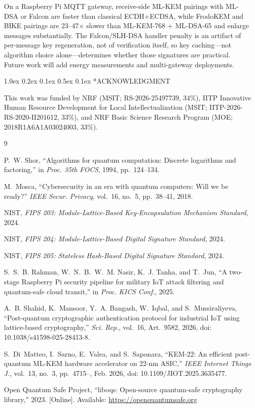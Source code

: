 \documentclass[a4paper,twocolumn,10pt]{article}
\makeatletter
\renewcommand{\section}{\@startsection{section}{1}{\z@}%
  {1.0ex \@plus 0.2ex \@minus 0.1ex}%
  {0.5ex \@plus 0.1ex}%
  {\normalfont\normalsize\bfseries}}
\makeatother
\begin{document}
On a Raspberry Pi MQTT gateway, receive-side ML-KEM pairings with ML-DSA or Falcon are faster than classical ECDH+ECDSA, while FrodoKEM and BIKE pairings are 23--47$\times$ slower than ML-KEM-768 + ML-DSA-65 and enlarge messages substantially. The Falcon/SLH-DSA handler penalty is an artifact of per-message key regeneration, not of verification itself, so key caching---not algorithm choice alone---determines whether those signatures are practical. Future work will add energy measurements and multi-gateway deployments.

\section*{ACKNOWLEDGMENT}

This work was funded by NRF (MSIT; RS-2026-25497739, 34\%), IITP Innovative Human Resource Development for Local Intellectualization (MSIT; IITP-2026-RS-2020-II201612, 33\%), and NRF Basic Science Research Program (MOE; 2018R1A6A1A03024003, 33\%).

\balance
\begin{thebibliography}{9}
\fontsize{8}{9.5}\selectfont

P.~W. Shor, ``Algorithms for quantum computation: Discrete logarithms and factoring,'' in \textit{Proc. 35th FOCS}, 1994, pp.~124--134.

M.~Mosca, ``Cybersecurity in an era with quantum computers: Will we be ready?'' \textit{IEEE Secur. Privacy}, vol.~16, no.~5, pp.~38--41, 2018.

NIST, \textit{FIPS 203: Module-Lattice-Based Key-Encapsulation Mechanism Standard}, 2024.

NIST, \textit{FIPS 204: Module-Lattice-Based Digital Signature Standard}, 2024.

NIST, \textit{FIPS 205: Stateless Hash-Based Digital Signature Standard}, 2024.

S.~S.~B. Rahman, W.~N.~B.~W.~M. Nasir, K.~J. Tanha, and T.~Jun, ``A two-stage Raspberry Pi security pipeline for military IoT attack filtering and quantum-safe cloud transit,'' in \textit{Proc. KICS Conf.}, 2025.

A.~B. Shahid, K.~Mansoor, Y.~A. Bangash, W.~Iqbal, and S.~Mussiraliyeva, ``Post-quantum cryptographic authentication protocol for industrial IoT using lattice-based cryptography,'' \textit{Sci. Rep.}, vol.~16, Art.~9582, 2026, doi: 10.1038/s41598-025-28413-8.

S.~Di~Matteo, I.~Sarno, E.~Valea, and S.~Saponara, ``KEM-22: An efficient post-quantum ML-KEM hardware accelerator on 22-nm ASIC,'' \textit{IEEE Internet Things J.}, vol.~13, no.~3, pp.~4715--, Feb. 2026, doi: 10.1109/JIOT.2025.3635477.

Open Quantum Safe Project, ``liboqs: Open-source quantum-safe cryptography library,'' 2023. [Online]. Available: \url{https://openquantumsafe.org}

\end{thebibliography}
\end{document}
